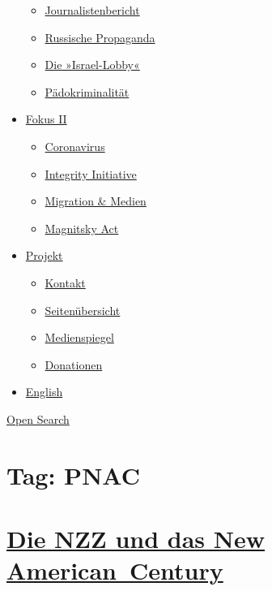 \begin{itemize}
  \begin{itemize}
  \tightlist
  \item
    \href{https://swprs.org/bericht-eines-journalisten/}{Journalistenbericht}
  \item
    \href{https://swprs.org/russische-propaganda/}{Russische Propaganda}
  \item
    \href{https://swprs.org/die-israel-lobby-fakten-und-mythen/}{Die
    »Israel-Lobby«}
  \item
    \href{https://swprs.org/geopolitik-und-paedokriminalitaet/}{Pädokriminalität}
  \end{itemize}
\item
  \href{https://swprs.org/migration-und-medien/}{Fokus II}

  \begin{itemize}
  \tightlist
  \item
    \href{https://swprs.org/covid-19-hinweis-ii/}{Coronavirus}
  \item
    \href{https://swprs.org/die-integrity-initiative/}{Integrity
    Initiative}
  \item
    \href{https://swprs.org/migration-und-medien/}{Migration \& Medien}
  \item
    \href{https://swprs.org/der-fall-magnitsky/}{Magnitsky Act}
  \end{itemize}
\item
  \href{https://swprs.org/kontakt/}{Projekt}

  \begin{itemize}
  \tightlist
  \item
    \href{https://swprs.org/kontakt/}{Kontakt}
  \item
    \href{https://swprs.org/uebersicht/}{Seitenübersicht}
  \item
    \href{https://swprs.org/medienspiegel/}{Medienspiegel}
  \item
    \href{https://swprs.org/donationen/}{Donationen}
  \end{itemize}
\item
  \href{https://swprs.org/contact/}{English}
\end{itemize}

\protect\hyperlink{}{Open Search}

\hypertarget{tag-pnac}{%
\section{Tag: PNAC}\label{tag-pnac}}

\hypertarget{die-nzz-und-das-new-american-century}{%
\section{\texorpdfstring{\href{https://swprs.org/2017/03/01/nzz-new-american-century/}{Die
NZZ und das New
American~Century}}{Die NZZ und das New American~Century}}\label{die-nzz-und-das-new-american-century}}

